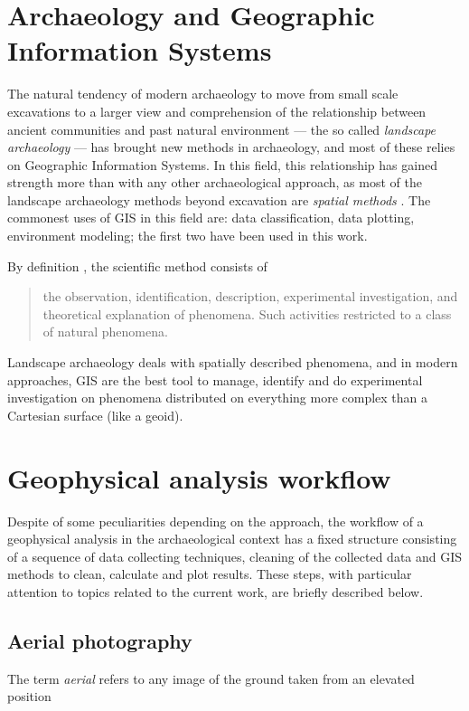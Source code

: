     \section{Archaeology and Geographic Information Systems}
        The natural tendency of modern archaeology to move from small scale excavations to a larger view and comprehension of the relationship between ancient communities and past natural environment --- the so called \emph{landscape archaeology} --- has brought new methods in archaeology, and most of these relies on Geographic Information Systems. In this field, this relationship has gained strength more than with any other archaeological approach, as most of the landscape archaeology methods beyond excavation are \emph{spatial methods} \cite[preface]{space-archaeology}. The commonest uses of GIS in this field are: data classification, data plotting, environment modeling; the first two have been used in this work.

        By definition \cite{american-dict}, the scientific method consists of
        \begin{quote}
            the observation, identification, description, experimental investigation, and theoretical explanation of phenomena. Such activities restricted to a class of natural phenomena.
        \end{quote}
        Landscape archaeology deals with spatially described phenomena, and in modern approaches, GIS are the best tool to manage, identify and do experimental investigation on phenomena distributed on everything more complex than a Cartesian surface (like a geoid).

    \section{Geophysical analysis workflow}
        Despite of some peculiarities depending on the approach, the workflow of a geophysical analysis in the archaeological context has a fixed structure consisting of a sequence of data collecting techniques, cleaning of the collected data and GIS methods to clean, calculate and plot results. These steps, with particular attention to topics related to the current work, are briefly described below.

        \subsection{Aerial photography}
            The term \emph{aerial} refers to any image of the ground taken from an elevated position \cite[p.~452]{terrestrial-remote}

